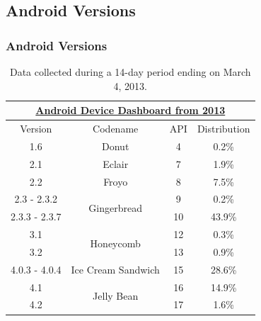 \subsection{Android Versions}
\begin{frame}
\frametitle{Android Versions}
\begin{table}[h]
\begin{tabular}{|c|c|c|c|} \hline
\multicolumn{4}{|c|}{\href{http://developer.android.com/about/dashboards/index.html}{Android Device Dashboard from 2013}} \\ \hline
Version & Codename &	API &	Distribution \\ \hline
1.6 & Donut & 4	& 0.2\% \\ \hline
2.1 & Eclair & 7 & 1.9\% \\ \hline
2.2 & Froyo  & 8 & 7.5\% \\ \hline
2.3 - 2.3.2 & \multirow{2}{*}{Gingerbread} & 9 &0.2\% \\
2.3.3 - 2.3.7 & & 10 & 43.9\% \\ \hline
3.1 & \multirow{2}{*}{Honeycomb} & 12 & 0.3\% \\
3.2 & & 13 & 0.9\% \\ \hline
4.0.3 - 4.0.4 & Ice Cream Sandwich & 15	& 28.6\% \\ \hline
4.1 & \multirow{2}{*}{Jelly Bean} & 16 & 14.9\% \\
4.2 & & 17 & 1.6\% \\ \hline
\end{tabular}
\caption{Data collected during a 14-day period ending on March 4, 2013.}
\end{table}
\end{frame}

